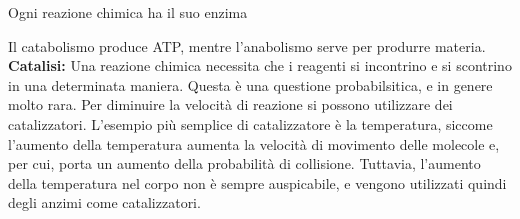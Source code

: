 \documentclass[a4paper]{article}
\begin{document}
\begin{center}
\end{center}

Ogni reazione chimica ha il suo enzima

\begin{center}
\end{center}


Il catabolismo produce ATP, mentre l'anabolismo serve per produrre materia.
\\
\textbf{Catalisi:}
Una reazione chimica necessita che i reagenti si incontrino e si scontrino in una determinata maniera.
Questa è una questione probabilsitica, e in genere molto rara.
Per diminuire la velocità di reazione si possono utilizzare dei catalizzatori.
L'esempio più semplice di catalizzatore è la temperatura, siccome l'aumento della temperatura
aumenta la velocità di movimento delle molecole e, per cui, porta un aumento della probabilità di collisione.
Tuttavia, l'aumento della temperatura nel corpo non è sempre auspicabile, e vengono utilizzati
quindi degli anzimi come catalizzatori.
\end{document}
